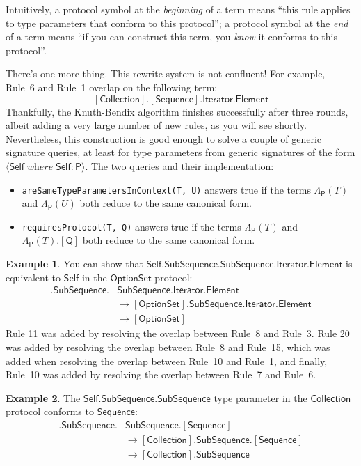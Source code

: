 \documentclass[a4paper,headsepline,bibliography=totoc,toc=flat,fleqn,twoside=semi]{scrbook}
\theoremstyle{definition}
\theoremstyle{definition}
\newtheorem{example}{Example}[chapter]
\theoremstyle{definition}
\newcommand{\namesym}[1]{\mathsf{#1}}
\newcommand{\genericparam}[1]{\bm{\mathsf{#1}}}
\newcommand{\proto}[1]{\bm{\mathsf{#1}}}
\newcommand{\protosym}[1]{[\proto{#1}]}
\newcommand{\gensig}[2]{\langle #1\;\textit{where}\;#2\rangle}
\begin{document}
Intuitively, a protocol symbol at the \emph{beginning} of a term means ``this rule applies to type parameters that conform to this protocol''; a protocol symbol at the \emph{end} of a term means ``if you can construct this term, you \emph{know} it conforms to this protocol''.

There's one more thing. This rewrite system is not confluent! For example, Rule~6 and Rule~1 overlap on the following term:
\[\protosym{Collection}.\protosym{Sequence}.\namesym{Iterator}.\namesym{Element}\]
Thankfully, the Knuth-Bendix algorithm finishes successfully after three rounds, albeit adding a very large number of new rules, as you will see shortly. Nevertheless, this construction is good enough to solve a couple of generic signature queries, at least for type parameters from generic signatures of the form $\gensig{\genericparam{Self}}{\genericparam{Self}\colon\proto{P}}$. The two queries and their implementation:
\begin{itemize}
\item \texttt{areSameTypeParametersInContext(T, U)} answers true if the terms $\Lambda_{\proto{P}}(T)$ and $\Lambda_{\proto{P}}(U)$ both reduce to the same canonical form.
\item \texttt{requiresProtocol(T, Q)} answers true if the terms $\Lambda_{\proto{P}}(T)$ and $\Lambda_{\proto{P}}(T).\protosym{Q}$ both reduce to the same canonical form.
\end{itemize}
\begin{example}
You can show that $\genericparam{Self}.\namesym{SubSequence}.\namesym{SubSequence}.\namesym{Iterator}.\namesym{Element}$ is equivalent to $\genericparam{Self}$ in the $\proto{OptionSet}$ protocol:
\begin{align}
\protosym{OptionSet}.\namesym{SubSequence}.&\namesym{SubSequence}.\namesym{Iterator}.\namesym{Element}\nonumber\\
&\rightarrow\protosym{OptionSet}.\namesym{SubSequence}.\namesym{Iterator}.\namesym{Element}\tag{Rule 11}\\
&\rightarrow\protosym{OptionSet}\tag{Rule 20}
\end{align}
Rule 11 was added by resolving the overlap between Rule~8 and Rule~3. Rule 20 was added by resolving the overlap between Rule~8 and Rule~15, which was added when resolving the overlap between Rule~10 and Rule~1, and finally, Rule~10 was added by resolving the overlap between Rule~7 and Rule~6.
\end{example}
\begin{example}
The $\genericparam{Self}.\namesym{SubSequence}.\namesym{SubSequence}$ type parameter in the $\proto{Collection}$ protocol conforms to $\proto{Sequence}$:
\begin{align}
\protosym{Collection}.\namesym{SubSequence}.&\namesym{SubSequence}.\protosym{Sequence}\nonumber\\
&\rightarrow\protosym{Collection}.\namesym{SubSequence}.\protosym{Sequence}\tag{Rule 2}\\
&\rightarrow\protosym{Collection}.\namesym{SubSequence}\tag{Rule 10}
\end{align}
\end{example}
\end{document}
